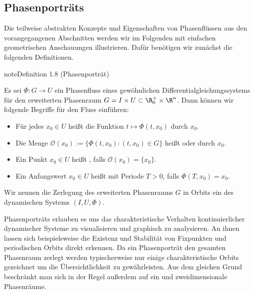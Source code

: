 \documentclass[letterpaper,10pt,german]{jupyterBook}
\begin{document}
\subsection{Phasenporträts}
\label{\detokenize{ode/fluesse:phasenportrats}}
\sphinxAtStartPar
Die teilweise abstrakten Konzepte und Eigenschaften von Phasenflüssen aus den vorangegangenen Abschnitten werden wir im Folgenden mit einfachen geometrischen Anschauungen illustrieren.
Dafür benötigen wir zunächst die folgenden Definitionen.
\label{ode/fluesse:definition-4}
\begin{sphinxadmonition}{note}{Definition 1.8 (Phasenporträt)}



\sphinxAtStartPar
Es sei \(\Phi:G\rightarrow U\) ein Phasenfluss eines gewöhnlichen Differentialgleichungssystems für den erweiterten Phasenraum \(G = I \times U\subset \R^+_0\times \R^n\).
Dann können wir folgende Begriffe für den Fluss einführen:
\begin{itemize}
\item {} 
\sphinxAtStartPar
Für jedes \(x_0\in U\) heißt die Funktion \(t\mapsto \Phi(t, x_0)\)  durch \(x_0\).

\item {} 
\sphinxAtStartPar
Die Menge \(\mathcal{O}(x_0) := \{\Phi(t, x_0): (t, x_0)\in G\}\) heißt  oder  durch \(x_0\).

\item {} 
\sphinxAtStartPar
Ein Punkt \(x_0 \in U\) heißt , falls \(\mathcal{O}(x_0) = \{x_0\}\).

\item {} 
\sphinxAtStartPar
Ein Anfangswert \(x_0\in U\) heißt  mit Periode \(T>0\), falls \(\Phi(T, x_0) = x_0\).

\end{itemize}

\sphinxAtStartPar
Wir nennen die Zerlegung des erweiterten Phasenraums \(G\) in Orbits ein  des dynamischen Systems \((I,U, \Phi)\).
\end{sphinxadmonition}

\sphinxAtStartPar
Phasenporträts erlauben es uns das charakteristische Verhalten kontinuierlicher dynamischer Systeme zu visualisieren und graphisch zu analysieren.
An ihnen lassen sich beispielsweise die Existenz und Stabilität von Fixpunkten und periodischen Orbits direkt erkennen.
Da ein Phasenporträt den gesamten Phasenraum zerlegt werden typischerweise nur einige charakteristische Orbits gezeichnet um die Übersichtlichkeit zu gewährleisten.
Aus dem gleichen Grund beschränkt man sich in der Regel außerdem auf ein\sphinxhyphen{} und zweidimensionale Phasenräume.
\end{document}
